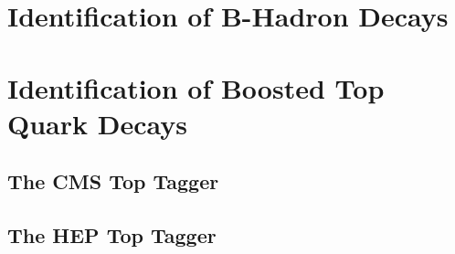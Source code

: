 \section{Identification of B-Hadron Decays}
\label{sec:btagging}

\section{Identification of Boosted Top Quark Decays}
\label{sec:boosted_tops}

\subsection{The CMS Top Tagger}
\label{sec:boosted_tops_cms_tagger}

\subsection{The HEP Top Tagger}
\label{sec:boosted_tops_hep_top_tagger}


